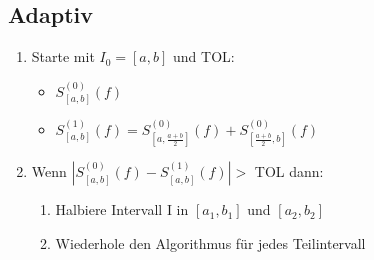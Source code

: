 \subsection{Adaptiv}
\begin{enumerate}
	
	\item Starte mit $I_0 = [a, b]$ und TOL: \\
	\begin{itemize}
		\item $S_{[a,b]}^{(0)}(f)$
		\item $S_{[a,b]}^{(1)}(f) = S_{[a,\frac{a+b}{2}]}^{(0)}(f) + S_{[\frac{a+b}{2},b]}^{(0)}(f)$
	\end{itemize}
	
	\item Wenn $|S_{[a,b]}^{(0)}(f) - S_{[a,b]}^{(1)}(f)| >$ TOL dann: \\
	
	\begin{enumerate}
		
		\item Halbiere Intervall I in $[a_1, b_1]$ und $[a_2, b_2]$	
		
		\item Wiederhole den Algorithmus für jedes Teilintervall
		
	\end{enumerate}
\end{enumerate}